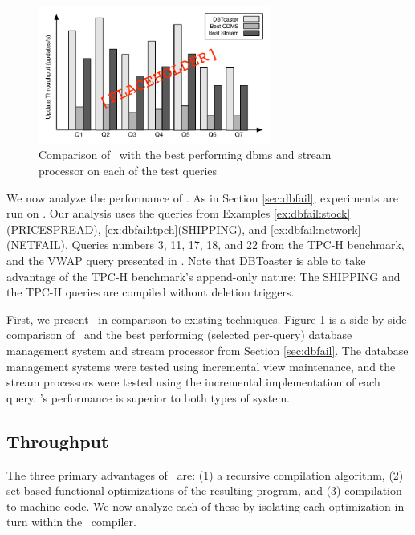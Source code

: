 
\begin{figure}
\begin{center}
\includegraphics[width=3in]{../graphics-tmp/placeholder_bakeoff}
\end{center}
\label{fig:experiments:bakeoff}
\caption{Comparison of \dbtoaster\ with the best performing dbms and stream processor on each of the test queries}
\end{figure}

We now analyze the performance of \dbtoaster.  As in Section \ref{sec:dbfail}, experiments are run on .  Our analysis uses the queries from Examples \ref{ex:dbfail:stock}(PRICESPREAD),  \ref{ex:dbfail:tpch}(SHIPPING), and \ref{ex:dbfail:network}(NETFAIL), Queries numbers 3, 11, 17, 18, and 22 from the TPC-H\cite{tpch} benchmark, and the VWAP query presented in \cite{kennedy-ahmad-koch-cidr:11}.  Note that DBToaster is able to take advantage of the TPC-H benchmark's append-only nature: The SHIPPING and the TPC-H queries are compiled without deletion triggers.

First, we present \dbtoaster\ in comparison to existing techniques.  Figure \ref{fig:experiments:bakeoff} is a side-by-side comparison of \dbtoaster\ and the best performing (selected per-query) database management system and stream processor from Section \ref{sec:dbfail}.  The database management systems were tested using incremental view maintenance, and the stream processors were tested using the incremental implementation of each query.   \dbtoaster 's performance is superior to both types of system. 

\subsection{Throughput}
The three primary advantages of \dbtoaster\ are: (1) a recursive compilation algorithm, (2) set-based functional optimizations of the resulting program, and (3) compilation to machine code.  We now analyze each of these by isolating each optimization in turn within the \dbtoaster\ compiler.

